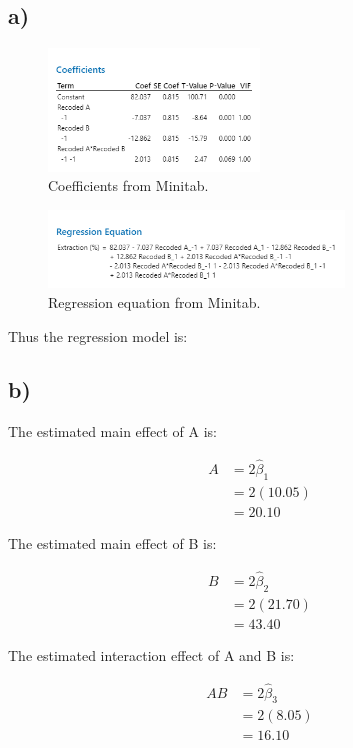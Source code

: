 \documentclass{article}
\begin{document}
\subsection*{a)}
\begin{figure}[h]
    \centering
    \includegraphics[width=0.5\textwidth]{./images/6_a_1.png}
    \caption{Coefficients from Minitab.}
    \label{fig:3_b_2}
\end{figure}

\begin{figure}[h]
    \centering
    \includegraphics[width=0.7\textwidth]{./images/6_a_2.png}
    \caption{Regression equation from Minitab.}
    \label{fig:3_b_2}
\end{figure}
Thus the regression model is:
\subsection*{b)}
\begin{flushleft}
The estimated main effect of A is:
\end{flushleft}
\begin{align*}
    A &= 2 \hat{\beta}_1\\
      &= 2(10.05)\\
      &= 20.10
\end{align*}
\begin{flushleft}
The estimated main effect of B is:
\end{flushleft}
\begin{align*}
    B &= 2 \hat{\beta}_2\\
      &= 2(21.70)\\
      &= 43.40
\end{align*}
\begin{flushleft}
The estimated interaction effect of A and B is:
\end{flushleft}
\begin{align*}
    AB &= 2 \hat{\beta}_3\\
       &= 2(8.05)\\
       &= 16.10
\end{align*}
\end{document}
